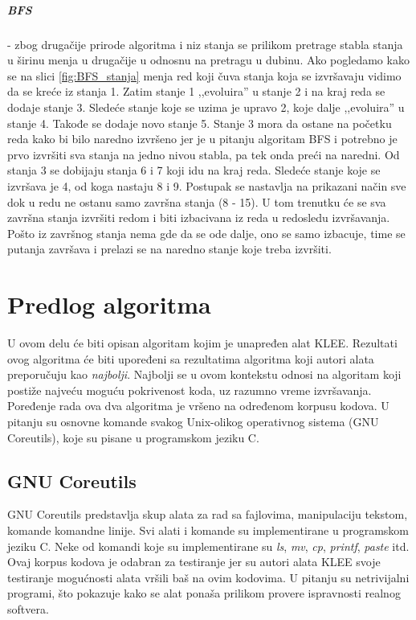\documentclass[12pt,oneside]{memoir}
\begin{document}
\paragraph{BFS} - zbog drugačije prirode algoritma i niz stanja se prilikom pretrage stabla stanja u širinu menja u drugačije u odnosnu na pretragu u dubinu. Ako pogledamo kako se na slici \ref{fig:BFS_stanja} menja red koji čuva stanja koja se izvršavaju vidimo da se kreće iz stanja 1. Zatim stanje 1 ,,evoluira'' u stanje 2 i na kraj reda se dodaje stanje 3. Sledeće stanje koje se uzima je upravo 2, koje dalje ,,evoluira'' u stanje 4. Takođe se dodaje novo stanje 5. Stanje 3 mora da ostane na početku reda kako bi bilo naredno izvršeno jer je u pitanju algoritam BFS i potrebno je prvo izvršiti sva stanja na jedno nivou stabla, pa tek onda preći na naredni. Od stanja 3 se dobijaju stanja 6 i 7 koji idu na kraj reda. Sledeće stanje koje se izvršava je 4, od koga nastaju 8 i 9. Postupak se nastavlja na prikazani način sve dok u redu ne ostanu samo završna stanja (8 - 15). U tom trenutku će se sva završna stanja izvršiti redom i biti izbacivana iz reda u redosledu izvršavanja. Pošto iz završnog stanja nema gde da se ode dalje, ono se samo izbacuje, time se putanja završava i prelazi se na naredno stanje koje treba izvršiti. 
\chapter{Predlog algoritma} \label{algoritam}
U ovom delu će biti opisan algoritam kojim je unapređen alat KLEE. Rezultati ovog algoritma će biti upoređeni sa rezultatima algoritma koji autori alata preporučuju kao \textit{najbolji}. Najbolji se u ovom kontekstu odnosi na algoritam koji postiže najveću moguću pokrivenost koda, uz razumno vreme izvršavanja. Poređenje rada ova dva algoritma je vršeno na određenom korpusu kodova. U pitanju su osnovne komande svakog Unix-olikog operativnog sistema (GNU Coreutils), koje su pisane u programskom jeziku C.

\section{GNU Coreutils}
GNU Coreutils predstavlja skup alata za rad sa fajlovima, manipulaciju tekstom, komande komandne linije. Svi alati i komande su implementirane u programskom jeziku C. Neke od komandi koje su implementirane su \textit{ls}, \textit{mv}, \textit{cp}, \textit{printf}, \textit{paste} itd. Ovaj korpus kodova je odabran za testiranje jer su autori alata KLEE svoje testiranje mogućnosti alata vršili baš na ovim kodovima. U pitanju su netrivijalni programi, što pokazuje kako se alat ponaša prilikom provere ispravnosti realnog softvera.
\end{document}
